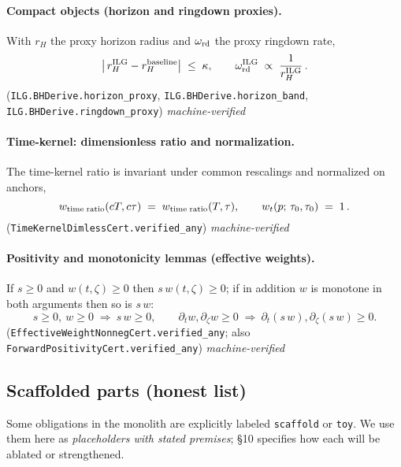 \documentclass[12pt,a4paper]{article}
\begin{document}
\paragraph{Compact objects (horizon and ringdown proxies).}
With \(r_H\) the proxy horizon radius and \(\omega_{\rm rd}\) the proxy ringdown rate,
\begin{equation}
  \bigl|\,r_H^{\rm ILG}-r_H^{\rm baseline}\bigr| \;\le\; \kappa,
  \qquad
  \omega_{\rm rd}^{\rm ILG}\;\propto\; \frac{1}{r_H^{\rm ILG}}\,.
  \label{eq:horizon-band}
\end{equation}
(\texttt{ILG.BHDerive.horizon\_proxy}, \texttt{ILG.BHDerive.horizon\_band}, \texttt{ILG.BHDerive.ringdown\_proxy}) \hfill\emph{machine-verified}

\paragraph{Time-kernel: dimensionless ratio and normalization.}
The time-kernel ratio is invariant under common rescalings and normalized on anchors,
\begin{equation}
  w_{\rm time\;ratio}(cT,c\tau) \;=\; w_{\rm time\;ratio}(T,\tau),
  \qquad
  w_t(p;\,\tau_0,\tau_0) \;=\; 1\,.
  \label{eq:timekernel}
\end{equation}
(\texttt{TimeKernelDimlessCert.verified\_any}) \hfill\emph{machine-verified}

\paragraph{Positivity and monotonicity lemmas (effective weights).}
If \(s\ge 0\) and \(w(t,\zeta)\ge 0\) then \(s\,w(t,\zeta)\ge 0\); if in addition \(w\) is monotone in both arguments then so is \(s\,w\):
\begin{equation}
  s\ge 0,\ w\ge 0 \;\Rightarrow\ s\,w\ge 0,
  \qquad
  \partial_t w,\partial_\zeta w \ge 0 \;\Rightarrow\ \partial_t(s\,w),\partial_\zeta(s\,w)\ge 0.
  \label{eq:effweight-positivity}
\end{equation}
(\texttt{EffectiveWeightNonnegCert.verified\_any}; also \texttt{ForwardPositivityCert.verified\_any}) \hfill\emph{machine-verified}

\subsection{Scaffolded parts (honest list)}
Some obligations in the monolith are explicitly labeled \texttt{scaffold} or \texttt{toy}. We use them here as \emph{placeholders with stated premises}; §10 specifies how each will be ablated or strengthened.
\end{document}
